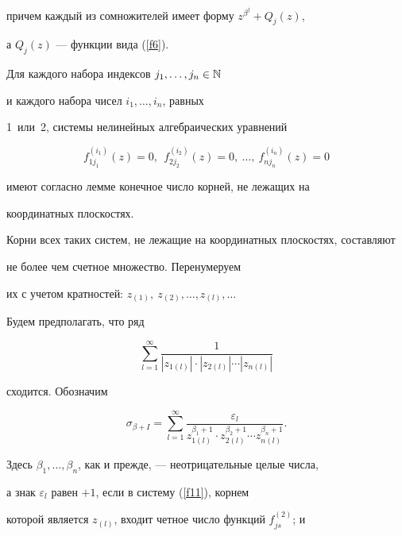 причем каждый из сомножителей имеет форму $z^{\beta^j}+Q_j(z)$,


а $Q_j(z)$ --- функции вида (\ref{f6}).





Для каждого набора индексов $j_1,\dotsc,j_n\in\Bbb N$


и каждого набора чисел $i_1,\dotsc, i_{n}$, равных


1~или~2, системы нелинейных алгебраических уравнений


\begin{equation}\label{f11}


f^{(i_1)}_{1j_1}(z)=0,\ \ f^{(i_2)}_{2j_2}(z)=0,\ \dotsc,


\ f^{(i_n)}_{nj_n}(z)=0


\end{equation}


имеют согласно лемме конечное число корней, не лежащих на


координатных плоскостях.





Корни всех таких систем, не лежащие на координатных плоскостях, составляют 


не более чем счетное множество. Перенумеруем


их с учетом кратностей: $z_{(1)},\  z_{(2)},\dotsc, z_{(l)},\dotsc$


Будем предполагать, что ряд


\begin{equation}\label{f12}


\sum_{l=1}^\infty \frac 1{|z_{1(l)}|\cdot |z_{2(l)}|\dotsb|z_{n(l)}|}


\end{equation}


сходится. Обозначим 


$$


\sigma_{\beta+I}=\sum_{l=1}^\infty \frac{\varepsilon_l}{z^{\beta_1+1}_{1(l)}


\cdot z^{\beta_2+1}_{2(l)}\dotsb z^{\beta_n+1}_{n(l)}}.


$$


Здесь $\beta_1,\dotsc,\beta_n$, как и прежде, --- неотрицательные целые числа,


а знак $\varepsilon_l$ равен $+1$, если в систему (\ref{f11}), корнем


которой является $z_{(l)}$, входит четное число функций $f^{(2)}_{js}$; и


